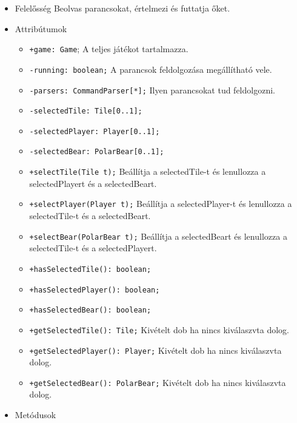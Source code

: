 \begin{itemize}
\item Felelősség\newline
Beolvas parancsokat, értelmezi és futtatja őket.
\item Attribútumok
	\begin{itemize}
		\item \texttt{+game: Game}; \newline
		A teljes játékot tartalmazza.
		\item \texttt{-running: boolean;} \newline
		A parancsok feldolgozása megállítható vele.
		\item \texttt{-parsers: CommandParser[*];} \newline
		Ilyen parancsokat tud feldolgozni.
		\item \texttt{-selectedTile: Tile[0..1];}
		\item \texttt{-selectedPlayer: Player[0..1];}
		\item \texttt{-selectedBear: PolarBear[0..1];}
		\item \texttt{+selectTile(Tile t);} \newline			
		Beállítja a selectedTile-t és lenullozza a selectedPlayert és a selectedBeart.			
		\item \texttt{+selectPlayer(Player t);} \newline
		Beállítja a selectedPlayer-t és lenullozza a selectedTile-t és a selectedBeart.	
		\item \texttt{+selectBear(PolarBear t);} \newline			
		Beállítja a selectedBeart és lenullozza a selectedTile-t és a selectedPlayert.			
		\item \texttt{+hasSelectedTile(): boolean;}
		\item \texttt{+hasSelectedPlayer(): boolean;}
		\item \texttt{+hasSelectedBear(): boolean;}
		\item \texttt{+getSelectedTile(): Tile;}
		Kivételt dob ha nincs kiválaszvta dolog.			
		\item \texttt{+getSelectedPlayer(): Player;} \newline
		Kivételt dob ha nincs kiválaszvta dolog.
		\item \texttt{+getSelectedBear(): PolarBear;} \newline
		Kivételt dob ha nincs kiválaszvta dolog.
	\end{itemize}
\item Metódusok
	\begin{itemize}

\end{itemize}
\end{itemize}
